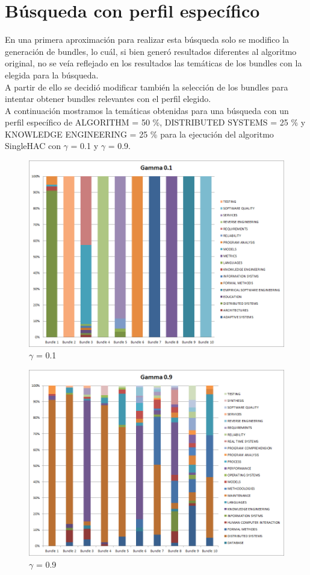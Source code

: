 \section{Búsqueda con perfil específico}
En una primera aproximación para realizar esta búsqueda solo se modifico la generación de bundles, 
lo cuál, si bien generó resultados diferentes al algoritmo original, no se veía reflejado en los 
resultados las temáticas de los bundles con la elegida para la búsqueda.\\
A partir de ello se decidió modificar también la selección de los bundles para intentar obtener 
bundles relevantes con el perfil elegido.\\
A continuación mostramos la temáticas obtenidas para una búsqueda con un perfil específico de 
ALGORITHM = 50 \%, DISTRIBUTED SYSTEMS = 25 \% y KNOWLEDGE ENGINEERING = 25 \% para la ejecución 
del algoritmo SingleHAC con $\gamma$ = 0.1 y $\gamma$ = 0.9.
\begin{figure}[H]
  \centering
    \includegraphics[width=\textwidth]{resultados/papers/intra_inter/grafico_gamm01.png}
  \caption{$\gamma$ = 0.1}
  \label{res:img-gamma01-especifico}
\end{figure}

\begin{figure}[H]
  \centering
    \includegraphics[width=\textwidth]{resultados/papers/intra_inter/grafico_gamm09.png}
  \caption{$\gamma$ = 0.9}
  \label{res:img-gamma09-especifico}
\end{figure}